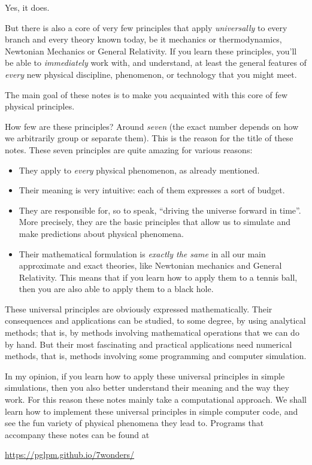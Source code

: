 \documentclass[a4paper,12pt,%
onecolumn,oneside,%
british%
]{memoir}
\renewcommand*{\|}[1][]{\nonscript\:#1\vert\nonscript\:\mathopen{}}
\begin{document}
Yes, it does.

But there is also a core of very few principles that apply \emph{universally} to every branch and every theory known today, be it mechanics or thermodynamics, Newtonian Mechanics or General Relativity. If you learn these principles, you'll be able to \emph{immediately} work with, and understand, at least the general features of \emph{every} new physical discipline, phenomenon, or technology that you might meet.

\medskip

The main goal of these notes is to make you acquainted with this core of few physical principles.

How few are these principles? Around \emph{seven} (the exact number depends on how we arbitrarily group or separate them). This is the reason for the title of these notes. These seven principles are quite amazing for various reasons:
\begin{itemize}
\item They apply to \emph{every} physical phenomenon, as already mentioned.
\item Their meaning is very intuitive: each of them expresses a sort of budget.
\item They are responsible for, so to speak, \enquote{driving the universe forward in time}. More precisely, they are the basic principles that allow us to simulate and make predictions about physical phenomena.
\item Their mathematical formulation is \emph{exactly the same} in all our main approximate and exact theories, like Newtonian mechanics and General Relativity. This means that if you learn how to apply them to a tennis ball, then you are also able to apply them to a black hole.
\end{itemize}

\medskip

These universal principles are obviously expressed mathematically. Their consequences and applications can be studied, to some degree, by using analytical methods; that is, by methods involving mathematical operations that we can do by hand. But their most fascinating and practical applications need numerical methods, that is, methods involving some programming and computer simulation.

In my opinion, if you learn how to apply these universal principles in simple simulations, then you also better understand their meaning and the way they work. For this reason these notes mainly take a computational approach. We shall learn how to implement these universal principles in simple computer code, and see the fun variety of physical phenomena they lead to. Programs that accompany these notes can be found at
\begin{center}
  \url{https://pglpm.github.io/7wonders/}
\end{center}
\end{document}
